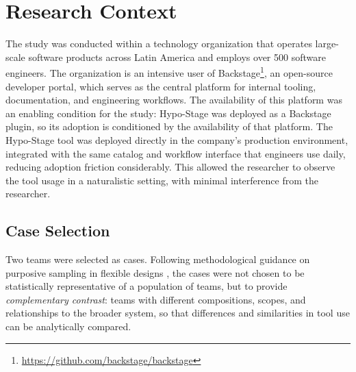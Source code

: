 \section{Research Context}
\label{sec:research-context}

The study was conducted within a technology organization that operates
large-scale software products across Latin America and employs over 500 software
engineers. The organization is an intensive user of Backstage\footnote{\url{https://github.com/backstage/backstage}}, an open-source
developer portal, which serves as the central platform for internal tooling,
documentation, and engineering workflows. The availability of this platform was an
enabling condition for the study: Hypo-Stage was deployed as a Backstage plugin, so its adoption is conditioned by the availability of that platform.
The Hypo-Stage tool was deployed directly in the company's production environment, integrated with the same catalog and workflow interface that engineers use daily, reducing adoption friction considerably. 
This allowed the researcher to observe the tool usage in a naturalistic setting, with minimal interference from the researcher.

\subsection{Case Selection}
\label{sec:case-selection}

Two teams were selected as cases. Following methodological guidance on purposive sampling in flexible designs \citep{robson2016}, the cases were not chosen
to be statistically representative of a population of teams, but to provide
\emph{complementary contrast}: teams with different compositions, scopes, and
relationships to the broader system, so that differences and similarities in tool use
can be analytically compared.

